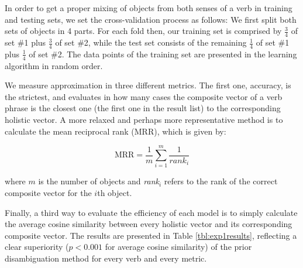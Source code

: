 \documentclass[11pt]{article}
\newcommand{\ov}{\overrightarrow}
\begin{document}
In order to get a proper mixing of objects from both senses of a verb in training and testing sets, we set the cross-validation process as follows: We first split both sets of objects in 4 parts. For each fold then, our training set is comprised by $\frac{3}{4}$ of set \#1 plus $\frac{3}{4}$ of set \#2, while the test set consists of the remaining $\frac{1}{4}$ of set \#1 plus $\frac{1}{4}$ of set \#2. The data points of the training set are presented in the learning algorithm in random order.

We measure approximation in three different metrics. The first one, accuracy, is the strictest, and evaluates in how many cases the composite vector of a verb phrase is the closest one (the first one in the result list) to the corresponding holistic vector. A more relaxed and perhaps more representative method is to calculate the mean reciprocal rank (MRR), which is given by:

\vspace{-0.3cm}
\begin{equation}
 \text{MRR} = \frac{1}{m} \sum\limits_{i=1}^m\frac{1}{\textit{rank}_i}
\end{equation}
\vspace{-0.3cm}

\noindent where $m$ is the number of objects and \textit{rank}$_i$ refers to the rank of the correct composite vector for the $i$th object.

Finally, a third way to evaluate the efficiency of each model is to simply calculate the average cosine similarity between every holistic vector and its corresponding composite vector.
%
%
The results are presented in Table \ref{tbl:exp1results}, reflecting a clear superiority ($p < 0.001$ for average cosine similarity) of the prior disambiguation method for every verb and every metric.
\end{document}
